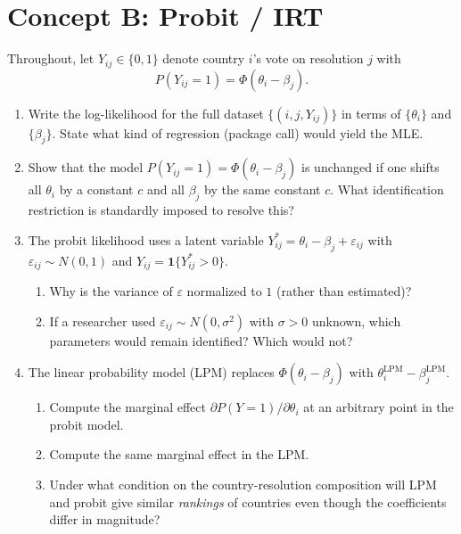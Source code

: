 \documentclass{article}
\begin{document}
\bigskip

\section*{Concept B: Probit / IRT}

Throughout, let $Y_{ij} \in \{0, 1\}$ denote country $i$'s vote on resolution $j$ with
$$P(Y_{ij} = 1) = \Phi(\theta_i - \beta_j).$$

\begin{enumerate}[label=\textbf{B.\arabic*},leftmargin=*,itemsep=10pt]

\item  Write the log-likelihood for the full dataset $\{(i, j, Y_{ij})\}$ in terms of $\{\theta_i\}$ and $\{\beta_j\}$.  State what kind of regression (package call) would yield the MLE.

\item  Show that the model $P(Y_{ij} = 1) = \Phi(\theta_i - \beta_j)$ is unchanged if one shifts all $\theta_i$ by a constant $c$ and all $\beta_j$ by the same constant $c$.  What identification restriction is standardly imposed to resolve this?

\item  The probit likelihood uses a latent variable $Y^*_{ij} = \theta_i - \beta_j + \varepsilon_{ij}$ with $\varepsilon_{ij} \sim N(0, 1)$ and $Y_{ij} = \mathbf 1\{Y^*_{ij} > 0\}$.
\begin{enumerate}[label=(\alph*)]
  \item Why is the variance of $\varepsilon$ normalized to $1$ (rather than estimated)?
  \item If a researcher used $\varepsilon_{ij} \sim N(0, \sigma^2)$ with $\sigma > 0$ unknown, which parameters would remain identified?  Which would not?
\end{enumerate}

\item  The linear probability model (LPM) replaces $\Phi(\theta_i - \beta_j)$ with $\theta_i^{\text{LPM}} - \beta_j^{\text{LPM}}$.
\begin{enumerate}[label=(\alph*)]
  \item Compute the marginal effect $\partial P(Y = 1)/\partial \theta_i$ at an arbitrary point in the probit model.
  \item Compute the same marginal effect in the LPM.
  \item Under what condition on the country-resolution composition will LPM and probit give similar \emph{rankings} of countries even though the coefficients differ in magnitude?
\end{enumerate}


\end{enumerate}
\end{document}

